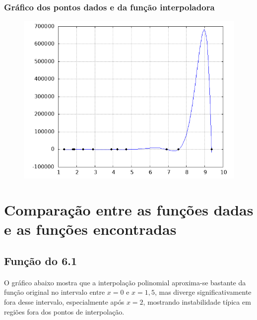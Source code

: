 \documentclass{article}
\begin{document}
                \subsubsection{Gráfico dos pontos dados e da função interpoladora}
                    \begin{figure}[H]
                        \centering
                        \includegraphics[width=0.5\linewidth]{exemplo3.png}
                        \label{fig:placeholder3}
                    \end{figure}

\newpage

\section{Comparação entre as funções dadas e as funções encontradas}

    \subsection{Função do 6.1}
        \paragraph{} O gráfico abaixo mostra que a interpolação polinomial aproxima-se bastante da função original no intervalo entre \(x = 0\) e \(x = 1{,}5\), mas diverge significativamente fora desse intervalo, especialmente após \(x = 2\), mostrando instabilidade típica em regiões fora dos pontos de interpolação.
\end{document}
